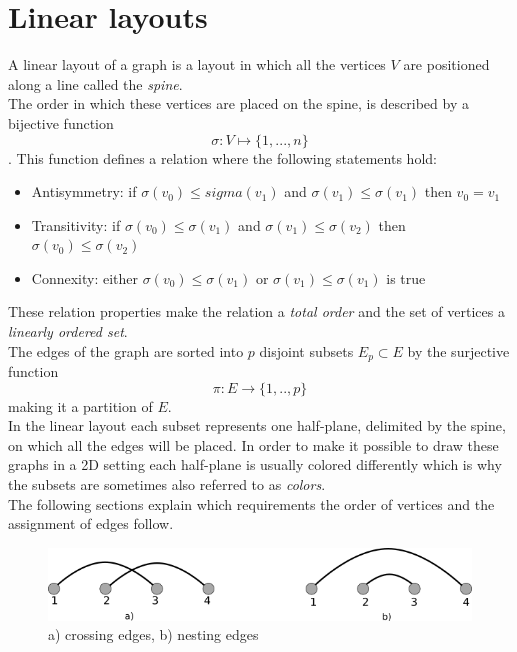 \section{Linear layouts}
\label{LL}
A linear layout of a graph is a layout in which all the vertices $V$ are positioned along a line called the \textit{spine}.\\
The order in which these vertices are placed on the spine, is described by a bijective function $$\sigma : V \mapsto \{1,...,n\} $$. This function defines a relation where the following statements hold:
\begin{itemize}
\item Antisymmetry: if $\sigma(v_0) \leq sigma(v_1)$ and $\sigma(v_1) \leq \sigma(v_1)$ then $v_0 = v_1$
\item Transitivity: if $\sigma(v_0) \leq \sigma(v_1)$ and $\sigma(v_1) \leq \sigma(v_2)$ then $\sigma(v_0) \leq \sigma(v_2)$
\item Connexity: either $\sigma(v_0) \leq \sigma(v_1)$ or $\sigma(v_1) \leq \sigma(v_1)$ is true
\end{itemize}
These relation properties make the relation a \textit{total order} and the set of vertices a \textit{linearly ordered set}.\\
The edges of the graph are sorted into $p$ disjoint subsets $E_p \subset E$ by the surjective function 
$$ \pi: E \rightarrow \{1,..,p\} $$ making it a partition of $E$.\\
In the linear layout each subset represents one half-plane, delimited by the spine, on which all the edges will be placed.
In order to make it possible to draw these graphs in a 2D setting each half-plane is usually colored differently which is why the subsets are sometimes also referred to as \textit{colors}.\\
The following sections explain which requirements the order of vertices and the assignment of edges follow.
\begin{figure}[!h]
\begin{center}
\includegraphics[width=1\textwidth]{figures/CrossingNesting.png}
\caption{a) crossing edges, b) nesting edges}
\label{img:crossNest}
\end{center}
\end{figure}
